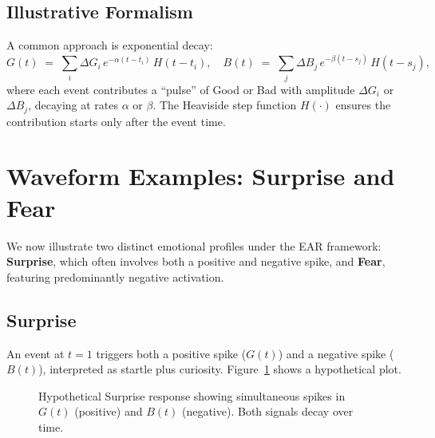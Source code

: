 \documentclass[11pt]{article}
\begin{document}
\subsection{Illustrative Formalism}
A common approach is exponential decay:
\[
G(t) \;=\; \sum_{i} \Delta G_i \, e^{-\alpha (t - t_i)}\, H(t - t_i), 
\quad
B(t) \;=\; \sum_{j} \Delta B_j \, e^{-\beta (t - s_j)}\, H(t - s_j),
\]
where each event contributes a “pulse” of Good or Bad with amplitude \(\Delta G_i\) or \(\Delta B_j\), decaying at rates \(\alpha\) or \(\beta\). The Heaviside step function \(H(\cdot)\) ensures the contribution starts only after the event time.

\section{Waveform Examples: Surprise and Fear}
\label{sec:waveform-examples}
We now illustrate two distinct emotional profiles under the EAR framework: \textbf{Surprise}, which often involves both a positive and negative spike, and \textbf{Fear}, featuring predominantly negative activation.

\subsection{Surprise}
An event at \(t=1\) triggers both a positive spike (\(G(t)\)) and a negative spike (\(B(t)\)), interpreted as startle plus curiosity. Figure~\ref{fig:surprise-waveform} shows a hypothetical plot.

\begin{figure}[htbp]
\centering
{}
\caption{Hypothetical Surprise response showing simultaneous spikes in $G(t)$ (positive) and $B(t)$ (negative). Both signals decay over time.}
\label{fig:surprise-waveform}
\end{figure}
\end{document}
